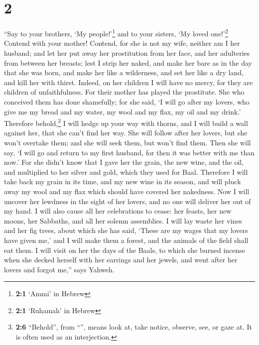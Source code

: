 \hypertarget{section-1}{%
\section{2}\label{section-1}}

 ``Say to your brothers, `My people!'\footnote{\textbf{2:1}
  `Ammi' in Hebrew} and to your sisters, `My loved one!'\footnote{\textbf{2:1}
  `Ruhamah' in Hebrew}  Contend with your mother! Contend,
for she is not my wife, neither am I her husband; and let her put away
her prostitution from her face, and her adulteries from between her
breasts;  lest I strip her naked, and make her bare as in
the day that she was born, and make her like a wilderness, and set her
like a dry land, and kill her with thirst.  Indeed, on her
children I will have no mercy, for they are children of unfaithfulness.
 For their mother has played the prostitute. She who
conceived them has done shamefully; for she said, `I will go after my
lovers, who give me my bread and my water, my wool and my flax, my oil
and my drink.'  Therefore behold,\footnote{\textbf{2:6}
  ``Behold'', from ``'', means look at, take notice,
  observe, see, or gaze at. It is often used as an interjection.} I will
hedge up your way with thorns, and I will build a wall against her, that
she can't find her way.  She will follow after her lovers,
but she won't overtake them; and she will seek them, but won't find
them. Then she will say, `I will go and return to my first husband, for
then it was better with me than now.'  For she didn't know
that I gave her the grain, the new wine, and the oil, and multiplied to
her silver and gold, which they used for Baal.  Therefore
I will take back my grain in its time, and my new wine in its season,
and will pluck away my wool and my flax which should have covered her
nakedness.  Now I will uncover her lewdness in the sight
of her lovers, and no one will deliver her out of my hand.
 I will also cause all her celebrations to cease: her
feasts, her new moons, her Sabbaths, and all her solemn assemblies.
 I will lay waste her vines and her fig trees, about
which she has said, `These are my wages that my lovers have given me,'
and I will make them a forest, and the animals of the field shall eat
them.  I will visit on her the days of the Baals, to
which she burned incense when she decked herself with her earrings and
her jewels, and went after her lovers and forgot me,'' says Yahweh.

